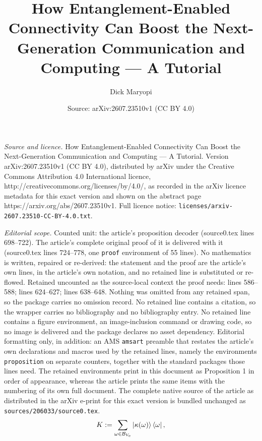 \documentclass[10pt,a4paper]{amsart}
\title{How Entanglement-Enabled Connectivity Can Boost the Next-Generation Communication and Computing — A Tutorial}
\author{Dick Maryopi}
\date{Source: arXiv:2607.23510v1 (CC BY 4.0)}
\begin{document}
\maketitle

\noindent\emph{Source and licence.} How Entanglement-Enabled Connectivity Can Boost the Next-Generation Communication and Computing — A Tutorial. Version arXiv:2607.23510v1 (CC BY 4.0), distributed by arXiv under the Creative Commons Attribution 4.0 International licence, http://creativecommons.org/licenses/by/4.0/, as recorded in the arXiv licence metadata for this exact version and shown on the abstract page https://arxiv.org/abs/2607.23510v1. Full licence notice: \texttt{licenses/arxiv-2607.23510-CC-BY-4.0.txt}.\par\smallskip

\noindent\textit{Editorial scope.} Counted unit: the article's proposition decoder (source0.tex lines 698--722). The article's complete original proof of it is delivered with it (source0.tex lines 724--778, one \texttt{proof} environment of 55 lines). No mathematics is written, repaired or re-derived: the statement and the proof are the article's own lines, in the article's own notation, and no retained line is substituted or re-flowed.  Retained uncounted as the source-local context the proof needs: lines 586--588; lines 624--627; lines 638--648.  Nothing was omitted from any retained span, so the package carries no omission record.  No retained line contains a citation, so the wrapper carries no bibliography and no bibliography entry.  No retained line contains a figure environment, an image-inclusion command or drawing code, so no image is delivered and the package declares no asset dependency.  Editorial formatting only, in addition: an AMS \texttt{amsart} preamble that restates the article's own declarations and macros used by the retained lines, namely the environments \texttt{proposition} on separate counters, together with the standard packages those lines need.  The retained environments print in this document as Proposition 1 in order of appearance, whereas the article prints the same items with the numbering of its own full document.  The complete native source of the article as distributed in the arXiv e-print for this exact version is bundled unchanged as \texttt{sources/206033/source0.tex}.
\begin{equation}
    {K}:= \sum_{\omega \in \mathcal{B}_{V_\mathrm{e}}} \ket{\kappa(\omega)}\bra{\omega}, \label{Prefix_Encoder_Operator}
\end{equation}
\end{document}
